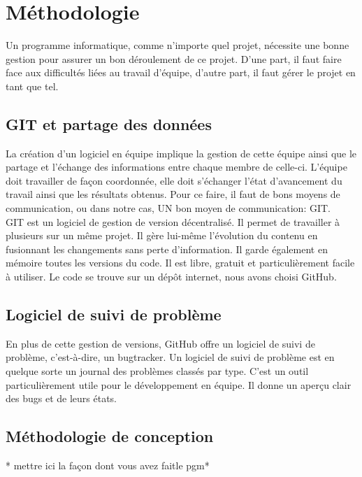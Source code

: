 \chapter{Méthodologie}
Un programme informatique, comme n'importe quel projet, nécessite une bonne gestion pour assurer un bon déroulement de ce projet.
D'une part, il faut faire face aux difficultés liées au travail d'équipe, d'autre part, il faut gérer le projet en tant que tel.

  \section{GIT et partage des données}
  La création d'un logiciel en équipe implique la gestion de cette équipe ainsi que le partage et l'échange des
  informations entre chaque membre de celle-ci.
  L'équipe doit travailler de façon coordonnée, elle doit s'échanger l'état
  d'avancement du travail ainsi que les résultats obtenus. Pour ce faire, il faut
  de bons moyens de communication, ou dans notre cas, UN bon moyen de communication: GIT\cite{git}. \\

  GIT est un logiciel de gestion de version décentralisé. Il permet de
  travailler à plusieurs sur un même projet. Il gère lui-même l'évolution du
  contenu en fusionnant les changements sans perte d'information. Il garde
  également en mémoire toutes les versions du code. Il est libre, gratuit et
  particulièrement facile à utiliser. Le code se trouve sur un dépôt internet, nous avons choisi GitHub\cite{github}.\\

  \section{Logiciel de suivi de problème}
  En plus de cette gestion de versions, GitHub offre un logiciel de suivi de problème, c'est-à-dire, un bugtracker.
  Un logiciel de suivi de problème est en quelque sorte un journal des problèmes classés par type.
  C'est un outil particulièrement utile pour le développement en équipe. Il donne un aperçu clair des bugs et de leurs états.

  \section{Méthodologie de conception}
    * mettre ici la façon dont vous avez \og fait\fg le pgm* \\
    
